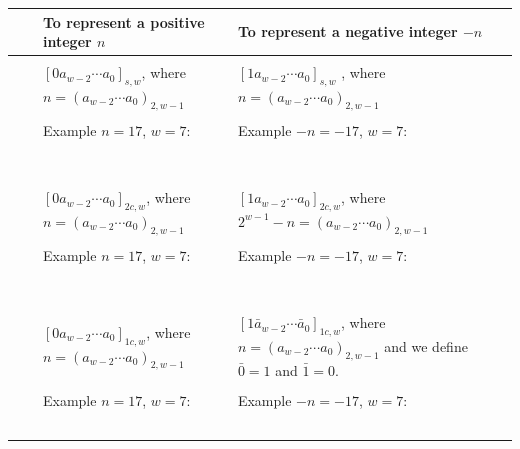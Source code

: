 \documentclass[12pt, oneside]{article}
\begin{document}
\begin{tabular}{|cc|p{3.4in}|p{3.7in}|}
\hline
& & To  represent a positive integer $n$ & To represent a negative integer $-n$\\
\hline
&& &  \\
&\parbox[t]{2mm}{} &
$[ 0a_{w-2} \cdots a_0]_{s,w}$, where $n =  (a_{w-2} \cdots a_0)_{2,w-1}$& 
$[1a_{w-2} \cdots a_0]_{s,w}$
, where $n =  (a_{w-2} \cdots a_0)_{2,w-1}$\\
&& & \\
&& Example $n=17$, $w=7$:  & Example $-n=-17$, $w=7$: \\
&& & \\
&& & \\
&& & \\
&& & \\
&& & \\
&& & \\
&& & \\
\hline
&&  &  \\
&\parbox[t]{2mm}{} &
$[0a_{w-2} \cdots a_0]_{2c,w}$, where $n =  (a_{w-2} \cdots a_0)_{2,w-1}$& $[1a_{w-2} \cdots a_0]_{2c,w}$, where $2^{w-1} - n =  (a_{w-2} \cdots a_0)_{2,w-1}$\\
&& & \\
&& Example $n=17$, $w=7$:  & Example $-n=-17$, $w=7$: \\
&& & \\
&& & \\
&& & \\
&& & \\
&& & \\
&& & \\
&& & \\
\hline
&&  &  \\
\parbox[t]{1.5mm}{} 
& \parbox[t]{2mm}{} &
$[0a_{w-2} \cdots a_0]_{1c,w}$, where $n =  (a_{w-2} \cdots a_0)_{2,w-1}$& $[1\bar{a}_{w-2} \cdots \bar{a}_0]_{1c,w}$, where $n =  (a_{w-2} \cdots a_0)_{2,w-1}$ and we define  $\bar{0} = 1$ and $\bar{1} = 0$.\\
&& & \\
&& Example $n=17$, $w=7$:  & Example $-n=-17$, $w=7$: \\
&& & \\
&& & \\
&& & \\
&& & \\
&& & \\
\hline
\end{tabular} \vfill
\end{document}
